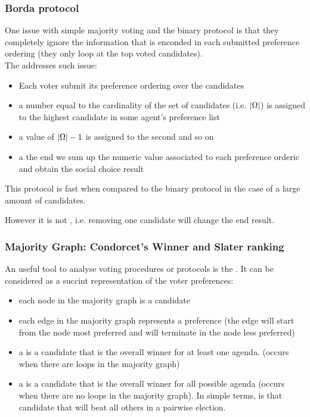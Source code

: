 \subsubsection{Borda protocol}
One issue with simple majority voting and the binary protocol is that they completely ignore the information that is enconded in each submitted preference ordering (they only loop at the top voted candidates).\\
The  addresses such issue:
\begin{itemize}
\item Each voter submit its preference ordering over the candidates
\item a number equal to the cardinality of the set of candidates (i.e. $\lvert\Omega\rvert$) is assigned to the highest candidate in some agent's preference list
\item a value of $\lvert\Omega\rvert-1$ is assigned to the second and so on
\item a the end we sum up the numeric value associated to each preference orderic and obtain the social choice result
\end{itemize}

This protocol is fast when compared to the binary protocol in the case of a large amount of candidates.

However it is not  , i.e. removing one candidate will change the end result.


\subsubsection{Majority Graph: Condorcet's Winner and Slater ranking}
An useful tool to analyse voting procedures or protocols is the . It can be considered as a succint representation of the voter preferences:
\begin{itemize}
\item each node in the majority graph is a candidate
\item each edge in the majority graph represents a preference (the edge will start from the node most preferred and will terminate in the node less preferred)
\item a  is a candidate that is the overall winner for at least one agenda. (occurs when there are loops in the majority graph)
\item a  is a candidate that is the overall winner for all possible agenda (occurs when there are no loops in the majority graph). In simple terms, is that candidate that will beat all others in a pairwise election.
\end{itemize}

